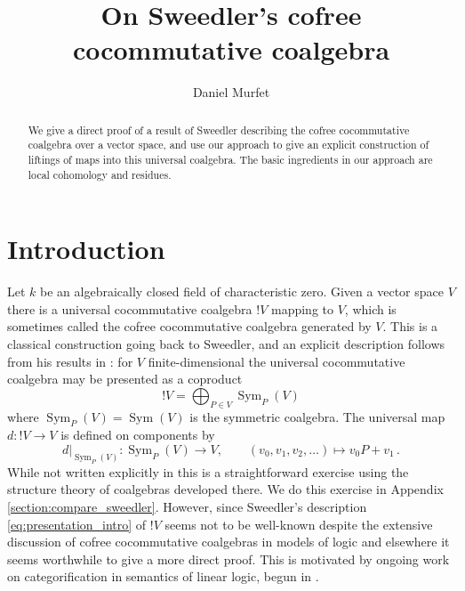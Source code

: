 \documentclass[english,letter paper,12pt,reqno]{article}
\theoremstyle{example}
\numberwithin{equation}{section}
\def\res{\operatorname{Res}}
\DeclareMathOperator{\Sym}{Sym}
\begin{document}
\def\ScoreOverhang{1pt}

\def\Res{\res\!}
\newcommand{\ud}[1]{\operatorname{d}\!{#1}}
\newcommand{\Ress}[1]{\res_{#1}\!}
\newcommand{\cat}[1]{\mathcal{#1}}
\newcommand{\lto}{\longrightarrow}
\newcommand{\xlto}[1]{\stackrel{#1}\lto}
\newcommand{\mf}[1]{\mathfrak{#1}}
\newcommand{\md}[1]{\mathscr{#1}}
\newcommand{\church}[1]{\underline{#1}}
\newcommand{\prf}[1]{\underline{#1}}
\newcommand{\den}[1]{\llbracket #1 \rrbracket}
\def\l{\,|\,}
\def\sgn{\textup{sgn}}
\def\cont{\operatorname{cont}}

\title{On Sweedler's cofree cocommutative coalgebra}
\author{Daniel Murfet}

\maketitle

\begin{abstract} We give a direct proof of a result of Sweedler describing the cofree cocommutative coalgebra over a vector space, and use our approach to give an explicit construction of liftings of maps into this universal coalgebra. The basic ingredients in our approach are local cohomology and residues.
\end{abstract}

\section{Introduction}

Let $k$ be an algebraically closed field of characteristic zero. Given a vector space $V$ there is a universal cocommutative coalgebra ${!}V$ mapping to $V$, which is sometimes called the cofree cocommutative coalgebra generated by $V$. This is a classical construction going back to Sweedler, and an explicit description follows from his results in \cite{sweedler}: for $V$ finite-dimensional the universal cocommutative coalgebra may be presented as a coproduct
\begin{equation}\label{eq:presentation_intro}
{!} V = \bigoplus_{P \in V} \Sym_P(V)
\end{equation}
where $\Sym_P(V) = \Sym(V)$ is the symmetric coalgebra. The universal map $d: {!} V \lto V$ is defined on components by
\[
d|_{\Sym_P(V)}: \Sym_P(V) \lto V, \qquad (v_0,v_1,v_2,\ldots) \longmapsto v_0 P + v_1\,.
\]
While not written explicitly in \cite{sweedler} this is a straightforward exercise using the structure theory of coalgebras developed there. We do this exercise in Appendix \ref{section:compare_sweedler}. However, since Sweedler's description \eqref{eq:presentation_intro} of ${!} V$ seems not to be well-known despite the extensive discussion of cofree cocommutative coalgebras in models of logic \cite{blute,hyland,mellies2,schreiber} and elsewhere it seems worthwhile to give a more direct proof. This is motivated by ongoing work on categorification in semantics of linear logic, begun in \cite{murfet}.
\end{document}
